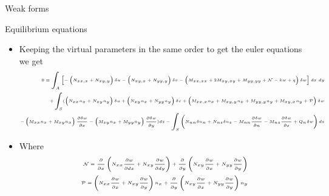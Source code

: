 \begin{frame}{Weak forms}
\begin{itemize}
		\end{itemize}
	\end{frame}


	\begin{frame}{Equilibrium equations}
		\begin{itemize}
			\item Keeping the virtual parameters in the same order to get the euler equations we get
			\begin{equation}
			\tiny
			\begin{aligned}
				0 = \int_A \left[ -\left(N_{xx,x} + N_{xy,y}\right)\delta u - \left( N_{xy,x} + N_{yy,y}\right)\delta v
		  			- \left(M_{xx,xx} + 2M_{xy,xy} + M_{yy,yy} + \mathcal{N} - kw + q\right) \delta w
							\right] dx~dy \\
				+ \int_S  (\left(N_{xx}n_x + N_{xy}n_y \right)\delta u  
			  + \left(N_{xy}n_x + N_{yy}n_y \right)\delta v
			  + \left( M_{xx,x}n_x + M_{xy,y}n_x + M_{yy,y}n_y + M_{xy,x}n_y + \mathcal{P} \right) \delta w \\
			  - \left(M_{xx}n_x + M_{xy}n_x \right)\frac{\partial \delta w}{\partial x} 
			  -\left(M_{xy}n_x + M_{yy}n_y \right)\frac{\partial \delta w}{\partial y} )ds  
			  -\int_S \left(N_{nn} \delta u_n + N_{ns}\delta u_s - M_{nn}\frac{\partial \delta w}{\partial n} - M_{ns}\frac{\partial \delta w}{\partial s} + Q_n \delta w \right)ds
			\end{aligned}
			\end{equation}
			\item Where 
				\begin{equation}
				\tiny
					\begin{aligned}
					\mathcal{N} = \frac{\partial }{\partial x} \left(N_{xx}\frac{\partial w}{\partial dx}   + N_{xy}\frac{\partial w}{\partial dy}\right)
					 + \frac{\partial }{\partial y} \left(N_{xy}\frac{\partial w}{\partial x} 
					+ N_{yy}\frac{\partial w}{\partial y}\right) \\
					\mathcal{P} = \left(N_{xx}\frac{\partial w}{\partial x}   + N_{xy}\frac{\partial w}{\partial y}\right) n_x
					+ \frac{\partial }{\partial y} \left(N_{xy}\frac{\partial w}{\partial x} 
					+ N_{yy}\frac{\partial w}{\partial y}\right) n_y 
					\end{aligned}
				\end{equation}
		\end{itemize}
	\end{frame}


